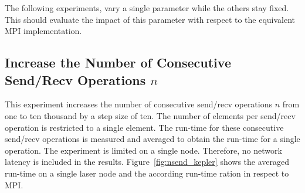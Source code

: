 \noindent The following experiments, vary a single parameter while the
others stay fixed. This should evaluate the impact of this parameter
with respect to the equivalent MPI implementation.

\subsection*{Increase the Number of Consecutive Send/Recv Operations $n$}
This experiment increases the number of consecutive send/recv
operations $n$ from one to ten thousand by a step size of ten. The number of
elements per send/recv operation is restricted to a single
element. The run-time for these consecutive send/recv operations is
measured and averaged to obtain the run-time for a single operation.
The experiment is limited on a single node. Therefore, no network
latency is included in the results.  Figure~\ref{fig:nsend_kepler}
shows the averaged run-time on a single laser node and the according
run-time ration in respect to MPI.

